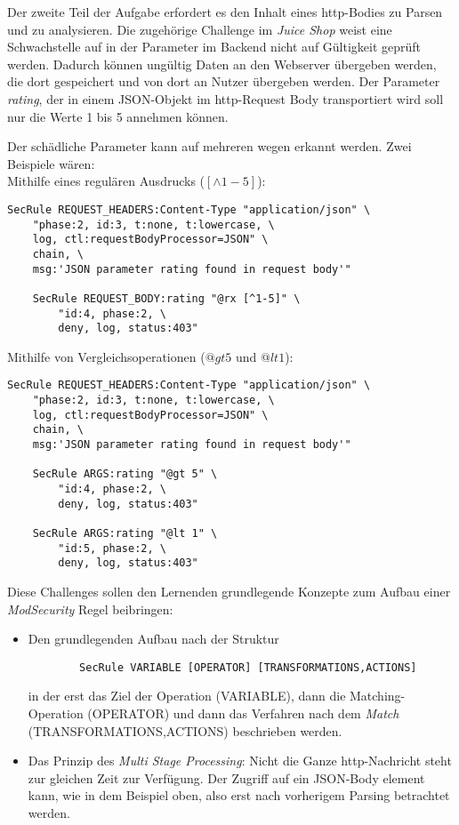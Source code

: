 Der zweite Teil der Aufgabe erfordert es den Inhalt eines \ac{http}-Bodies zu Parsen und zu analysieren.
Die zugehörige Challenge im \textit{Juice Shop} weist eine Schwachstelle auf in der Parameter im Backend nicht auf Gültigkeit geprüft werden.
Dadurch können ungültig Daten an den Webserver übergeben werden, die dort gespeichert und von dort an Nutzer übergeben werden.
Der Parameter \textit{rating}, der in einem JSON-Objekt im \ac{http}-Request Body transportiert wird soll nur die Werte 1 bis 5 annehmen können.

Der schädliche Parameter kann auf mehreren wegen erkannt werden.
Zwei Beispiele wären:\\

Mithilfe eines regulären Ausdrucks ($[\land 1-5]$):
\begin{verbatim}
SecRule REQUEST_HEADERS:Content-Type "application/json" \
    "phase:2, id:3, t:none, t:lowercase, \
    log, ctl:requestBodyProcessor=JSON" \
    chain, \
    msg:'JSON parameter rating found in request body'"

    SecRule REQUEST_BODY:rating "@rx [^1-5]" \
        "id:4, phase:2, \
        deny, log, status:403"
\end{verbatim}


Mithilfe von Vergleichsoperationen ($@gt 5$ und $@lt 1$):
\begin{verbatim}
SecRule REQUEST_HEADERS:Content-Type "application/json" \
    "phase:2, id:3, t:none, t:lowercase, \
    log, ctl:requestBodyProcessor=JSON" \
    chain, \
    msg:'JSON parameter rating found in request body'"
    
    SecRule ARGS:rating "@gt 5" \
        "id:4, phase:2, \
        deny, log, status:403"

    SecRule ARGS:rating "@lt 1" \
        "id:5, phase:2, \
        deny, log, status:403"
\end{verbatim}

Diese Challenges sollen den Lernenden grundlegende Konzepte zum Aufbau einer \textit{ModSecurity} Regel beibringen:
\begin{itemize}
    \item Den grundlegenden Aufbau nach der Struktur
    \begin{verbatim}
        SecRule VARIABLE [OPERATOR] [TRANSFORMATIONS,ACTIONS]
    \end{verbatim}
    in der erst das Ziel der Operation (VARIABLE), dann die Matching-Operation (OPERATOR) und dann das Verfahren nach dem \textit{Match} (TRANSFORMATIONS,ACTIONS) beschrieben werden.
    \item Das Prinzip des \textit{Multi Stage Processing}: Nicht die Ganze \ac{http}-Nachricht steht zur gleichen Zeit zur Verfügung. Der Zugriff auf ein JSON-Body element kann, wie in dem Beispiel oben, also erst nach vorherigem Parsing betrachtet werden.
\end{itemize}

